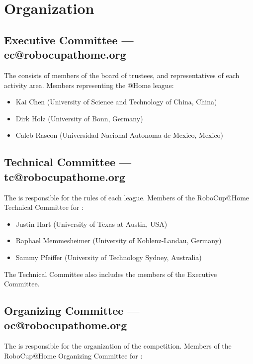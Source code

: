 \section{Organization}

\subsection{Executive Committee --- ec@robocupathome.org}
\label{sec:ec}
The  consists of members of the board of trustees, and representatives of each activity area. Members representing the @Home league:
\begin{itemize}
  \item Kai Chen (University of Science and Technology of China, China)
  \item Dirk Holz (University of Bonn, Germany)
  \item Caleb Rascon (Universidad Nacional Autonoma de Mexico, Mexico)
\end{itemize}

\subsection{Technical Committee --- tc@robocupathome.org}
\label{sec:tc}
The  is responsible for the rules of each league. Members of the RoboCup@Home Technical Committee for \YEAR:
\begin{itemize}
  \item Justin Hart (University of Texas at Austin, USA)
  \item Raphael Memmesheimer (University of Koblenz-Landau, Germany)
  \item Sammy Pfeiffer (University of Technology Sydney, Australia)
\end{itemize}
The Technical Committee also includes the members of the Executive Committee.

\subsection{Organizing Committee --- oc@robocupathome.org}
\label{sec:oc}
The  is responsible for the organization of the competition. Members of the RoboCup@Home Organizing Committee for \YEAR:

